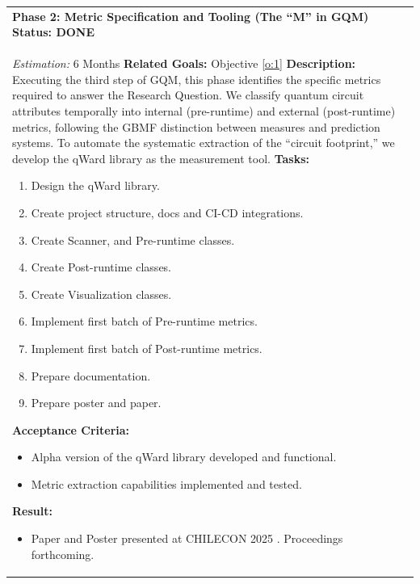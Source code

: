\documentclass{article}
\begin{document}
\begin{longtable}{@{}p{\textwidth}@{}}
    \textbf{Phase 2: Metric Specification and Tooling (The ``M'' in GQM)} \label{p:2} \hfill \textbf{Status: DONE} \\
    \textit{Estimation:} 6 Months \newline
    \textbf{Related Goals:} Objective \ref{o:1} \newline
    \textbf{Description:} Executing the third step of GQM, this phase identifies the specific metrics required to answer the Research Question. We classify quantum circuit attributes temporally into internal (pre-runtime) and external (post-runtime) metrics, following the GBMF distinction between measures and prediction systems. To automate the systematic extraction of the ``circuit footprint,'' we develop the qWard library as the measurement tool. \newline
    \textbf{Tasks:}
    \begin{enumerate}[label=T2.\arabic*, ref=T2.\arabic*, font=\bfseries, leftmargin=3.5em, labelindent=0pt, itemindent=0pt, labelsep=0.5em, noitemsep, topsep=0pt]
        \item \label{p2:t1} Design the qWard library.
        \item \label{p2:t2} Create project structure, docs and CI-CD integrations.
        \item \label{p2:t3} Create Scanner, and Pre-runtime classes.
        \item \label{p2:t4} Create Post-runtime classes.
        \item \label{p2:t5} Create Visualization classes.
        \item \label{p2:t6} Implement first batch of Pre-runtime metrics.
        \item \label{p2:t7} Implement first batch of Post-runtime metrics.
        \item \label{p2:t8} Prepare documentation.
        \item \label{p2:t9} Prepare poster and paper.
    \end{enumerate}
    \textbf{Acceptance Criteria:}
    \begin{itemize}[leftmargin=1.5em, labelindent=0pt, itemindent=0pt, noitemsep, topsep=0pt]
        \item Alpha version of the qWard library developed and functional.
        \item Metric extraction capabilities implemented and tested.
    \end{itemize}
    \textbf{Result:}
    \begin{itemize}[leftmargin=1.5em, labelindent=0pt, itemindent=0pt, noitemsep, topsep=0pt]
        \item Paper and Poster presented at CHILECON 2025 \cite{marquezQwardUnifiedToolkit_2025}. Proceedings forthcoming.
    \end{itemize} \\
    \midrule
    

\end{longtable}
\end{document}
